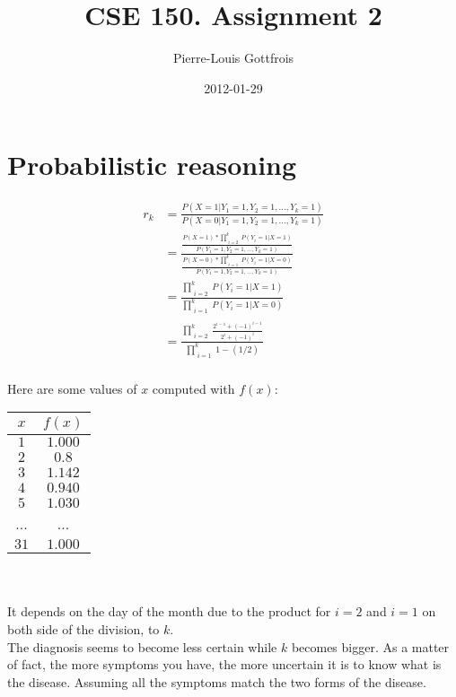 \documentclass[]{article}
\title{CSE 150. Assignment 2}
\author{Pierre-Louis Gottfrois}
\date{2012-01-29}
\begin{document}
\ifpdf
{}
\else
{}
\fi

\maketitle

\section{Probabilistic reasoning}
\begin{align*}
  r_{k} & = \frac{P(X =1|Y_{1} =1, Y_{2} =1, . . . , Y_{k} =1)}{P(X =0|Y_{1} =1, Y_{2} =1, . . . , Y_{k} =1)} \\
  &= \frac{\frac{P(X=1)*\prod_{\substack{i=2}}^{k} P(Y_{i}=1|X=1)}{P(Y_{1}=1,Y_{2}=1, . . . , Y_{k}=1)}}{\frac{P(X=0)*\prod_{\substack{i=1}}^{k} P(Y_{i}=1|X=0)}{P(Y_{1}=1,Y_{2}=1, . . . , Y_{k}=1)}} \\
  &= \frac{\prod_{\substack{i=2}}^{k} P(Y_{i}=1|X=1)}{\prod_{\substack{i=1}}^{k} P(Y_{i}=1|X=0)} \\
  &= \frac{\prod_{\substack{i=2}}^{k} \frac{2^{i-1}+(-1)^{i-1}}{2^i+(-1)^i}}{\prod_{\substack{i=1}}^{k} 1-(1/2)} \\
\end{align*}

Here are some values of $x$ computed with $f(x)$: \\

\begin{tabular}{|c|c|}
  \hline
  $x$ & $f(x)$ \\
  \hline
  $1$ & $1.000$ \\
  \hline
  $2$ & $0.8$ \\
  \hline
  $3$ & $1.142$ \\
  \hline
  $4$ & $0.940$ \\
  \hline
  $5$ & $1.030$ \\
  \hline
  ... & ... \\
  \hline
  $31$ & $1.000$ \\
  \hline
\end{tabular}
\\
\\
It depends on the day of the month due to the product for $i=2$ and $i=1$ on both side of the division, to $k$. \\
The diagnosis seems to become less certain while $k$ becomes bigger. As a matter of fact, the more symptoms you have, the more uncertain it is to know what is the disease.
Assuming all the symptoms match the two forms of the disease.
\end{document}
